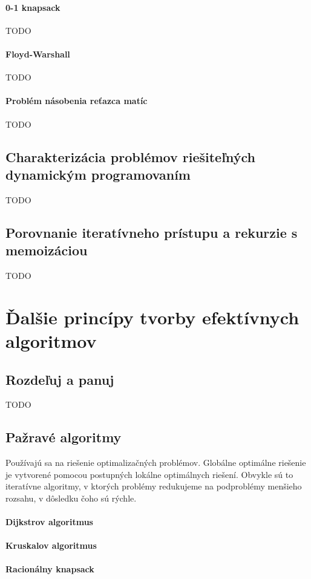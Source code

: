 		\paragraph{0-1 knapsack} TODO
		\paragraph{Floyd-Warshall} TODO
		\paragraph{Problém násobenia reťazca matíc} TODO

	\subsection{Charakterizácia problémov riešiteľných dynamickým programovaním} TODO
	
	\subsection{Porovnanie iteratívneho prístupu a rekurzie s memoizáciou} TODO


\section{Ďalšie princípy tvorby efektívnych algoritmov}
	\subsection{Rozdeľuj a panuj}
	TODO
	\subsection{Pažravé algoritmy}
		Používajú sa na riešenie optimalizačných problémov. Globálne optimálne riešenie je vytvorené pomocou postupných lokálne optimálnych riešení. Obvykle sú to iteratívne algoritmy, v ktorých problémy redukujeme na podproblémy menšieho rozsahu, v dôsledku čoho sú rýchle.
		\paragraph{Dijkstrov algoritmus}
		\paragraph{Kruskalov algoritmus}
		\paragraph{Racionálny knapsack}
